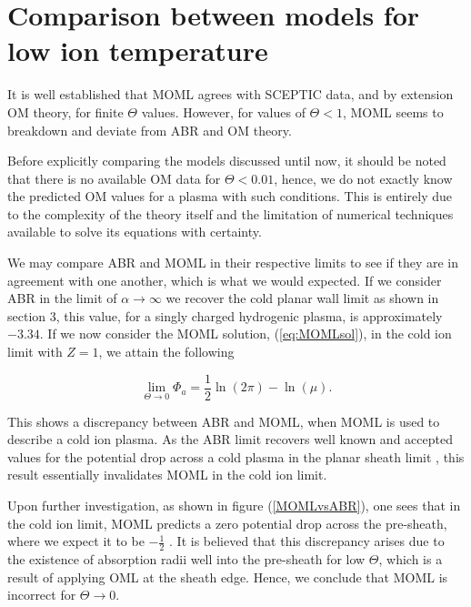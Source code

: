 \documentclass{article}
\begin{document}
\newpage 

\section{Comparison between models for low ion temperature}

\smallskip

It is well established that MOML agrees with SCEPTIC data, and by extension OM theory,
for finite $\Theta$ values. However, for values of $\Theta < 1$, MOML seems to breakdown and deviate 
from ABR and OM theory. 

\smallskip

Before explicitly comparing the models discussed until now, it should be noted that 
there is no available OM data for $\Theta < 0.01$, hence, we do not exactly know the predicted OM
values for a plasma with such conditions. This is entirely due to the complexity
of the theory itself and the limitation of numerical techniques available to solve its equations
with certainty. 

\smallskip

We may compare ABR and MOML in their respective limits to see if they are in 
agreement with one another, which is what we would expected.
If we consider ABR in the limit of $\alpha \to \infty$ we recover the cold planar
wall limit as shown in section 3, this value, for a singly charged hydrogenic plasma, is approximately $-3.34$. If we now consider
the MOML solution, (\ref{eq:MOMLsol}), in the cold ion limit with $Z = 1$, we attain the following

\begin{equation}\label{eq:OMLLim}
\lim_{\Theta \to 0} \Phi_{a} = \frac{1}{2}\ln{\left(2 \pi \right)} - \ln{\left(\mu \right)}.
\end{equation}

\smallskip

This shows a discrepancy between ABR and MOML, when MOML is used to
describe a cold ion plasma. As the ABR limit recovers well known and accepted values for
the potential drop across a cold plasma in the planar sheath limit \cite{Stangeby1986} \cite{Stangeby2000}, this result essentially
invalidates MOML in the cold ion limit.

\medskip

Upon further investigation, as shown in figure (\ref{MOMLvsABR}), one sees that in the cold ion limit, MOML
predicts a zero potential drop across the pre-sheath, where we expect it to be $-\frac{1}{2}$ \cite{Stangeby1986}.
It is believed that this discrepancy arises due to the existence of absorption radii well into
the pre-sheath for low $\Theta$, which is a result of applying OML at the sheath edge. 
Hence, we conclude that MOML is incorrect for $\Theta \to 0$.
\end{document}
